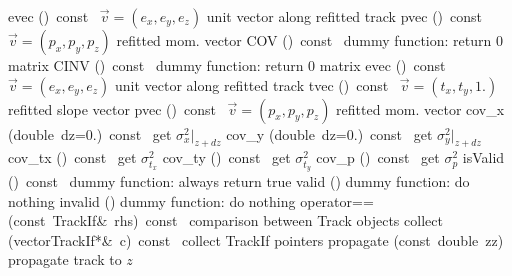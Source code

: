 \documentclass{article}
\begin{document}
\begin{cxxentry}
\begin{cxxclass}
\begin{cxxpublic}
\label{cxx.1.1.34}
        {evec}
        {()\ const\ }
        { $\vec{v} = (e_x,e_y,e_z)$ unit vector along refitted track}
        {}
\label{cxx.1.1.35}
        {pvec}
        {()\ const\ }
        { $\vec{v} = (p_x,p_y,p_z)$ refitted mom. vector}
        {}
\label{cxx.1.1.36}
        {COV}
        {()\ const\ }
        { dummy function: return 0 matrix}
        {}
\label{cxx.1.1.37}
        {CINV}
        {()\ const\ }
        { dummy function: return 0 matrix}
        {}
\label{cxx.1.1.38}
        {evec}
        {()\ const\ }
        { $\vec{v} = (e_x,e_y,e_z)$ unit vector along refitted track}
        {}
\label{cxx.1.1.39}
        {tvec}
        {()\ const\ }
        { $\vec{v} = (t_x,t_y,1.)$ refitted slope vector}
        {}
\label{cxx.1.1.40}
        {pvec}
        {()\ const\ }
        { $\vec{v} = (p_x,p_y,p_z)$ refitted mom. vector}
        {}
\label{cxx.1.1.41}
        {cov\_x}
        {(double\ dz=0.)\ const\ }
        { get $\sigma_x^2|_{z+dz}$}
        {}
\label{cxx.1.1.42}
        {cov\_y}
        {(double\ dz=0.)\ const\ }
        { get $\sigma_y^2|_{z+dz}$}
        {}
\label{cxx.1.1.43}
        {cov\_tx}
        {()\ const\ }
        { get $\sigma_{t_x}^2$}
        {}
\label{cxx.1.1.44}
        {cov\_ty}
        {()\ const\ }
        { get $\sigma_{t_y}^2$}
        {}
\label{cxx.1.1.45}
        {cov\_p}
        {()\ const\ }
        { get $\sigma_p^2$}
        {}
\label{cxx.1.1.46}
        {isValid}
        {()\ const\ }
        { dummy function: always return true}
        {}
\label{cxx.1.1.47}
        {valid}
        {()}
        { dummy function: do nothing}
        {}
\label{cxx.1.1.48}
        {invalid}
        {()}
        { dummy function: do nothing}
        {}
\label{cxx.1.1.49}
        {operator==}
        {(const\ TrackIf\&\ rhs)\ const\ }
        { comparison between Track objects}
        {}
\label{cxx.1.1.50}
        {collect}
        {(vector\<TrackIf*\>\&\ c)\ const\ }
        { collect TrackIf pointers}
        {}
\label{cxx.1.1.51}
        {propagate}
        {(const\ double\ zz)}
        { propagate track to $z$}
        {}
\label{cxx.1.1.52}
\cxxitem{}

\end{cxxpublic}
\end{cxxclass}
\end{cxxentry}
\end{document}
